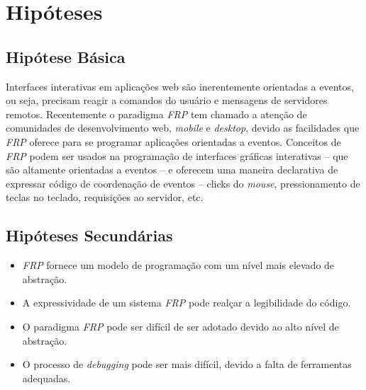 \section{Hipóteses}\label{lhipoteses}


\subsection{Hipótese Básica}

Interfaces interativas em aplicações web
são inerentemente orientadas a eventos,
ou seja, precisam reagir a comandos do usuário e
mensagens de servidores remotos.
Recentemente o paradigma \emph{FRP}
tem chamado a atenção de
comunidades de desenvolvimento web, \emph{mobile}
e \emph{desktop}, devido as facilidades que \emph{FRP}
oferece para se programar aplicações orientadas a eventos.
Conceitos de \emph{FRP} podem ser usados
na programação de interfaces gráficas interativas
-- que são altamente orientadas a eventos --
e oferecem uma maneira declarativa de expressar
código de coordenação de eventos -- clicks do \emph{mouse},
pressionamento de teclas no teclado, requisições ao servidor, etc.


\subsection{Hipóteses Secundárias}

\begin{itemize}[noitemsep]
  \item \emph{FRP} fornece um modelo de programação com um
        nível mais elevado de abstração.
  \item A expressividade de um sistema \emph{FRP} pode
        realçar a legibilidade do código.
  \item O paradigma \emph{FRP} pode ser difícil de ser adotado
        devido ao alto nível de abstração.
  \item O processo de \emph{debugging} pode ser mais difícil,
        devido a falta de ferramentas adequadas.
\end{itemize}

